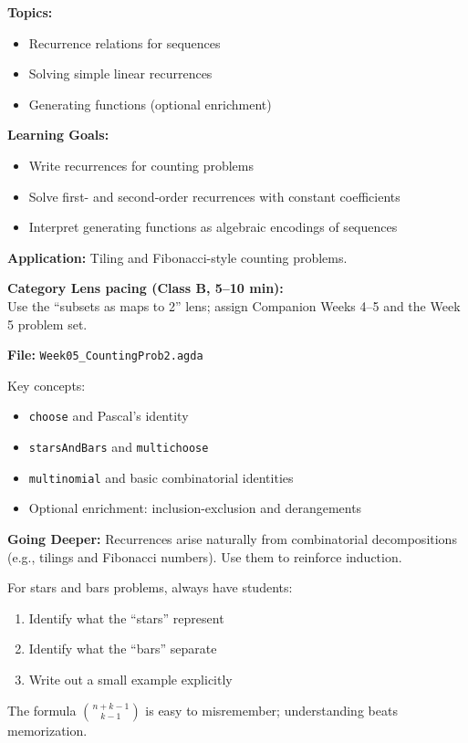 \documentclass[11pt]{article}
\begin{document}
\begin{classbbox}
\textbf{Topics:}
\begin{itemize}
    \item Recurrence relations for sequences
    \item Solving simple linear recurrences
    \item Generating functions (optional enrichment)
\end{itemize}

\textbf{Learning Goals:}
\begin{itemize}
    \item Write recurrences for counting problems
    \item Solve first- and second-order recurrences with constant coefficients
    \item Interpret generating functions as algebraic encodings of sequences
\end{itemize}

\textbf{Application:} Tiling and Fibonacci-style counting problems.
\end{classbbox}

\textbf{Category Lens pacing (Class B, 5--10 min):}\\
Use the ``subsets as maps to 2'' lens; assign Companion Weeks 4--5 and the Week 5 problem set.

\begin{agdabox}
\textbf{File:} \texttt{Week05\_CountingProb2.agda}

Key concepts:
\begin{itemize}
    \item \texttt{choose} and Pascal's identity
    \item \texttt{starsAndBars} and \texttt{multichoose}
    \item \texttt{multinomial} and basic combinatorial identities
    \item Optional enrichment: inclusion-exclusion and derangements
\end{itemize}

\textbf{Going Deeper:} Recurrences arise naturally from combinatorial decompositions (e.g., tilings and Fibonacci numbers). Use them to reinforce induction.
\end{agdabox}

\begin{tipbox}
For stars and bars problems, always have students:
\begin{enumerate}
    \item Identify what the ``stars'' represent
    \item Identify what the ``bars'' separate
    \item Write out a small example explicitly
\end{enumerate}
The formula $\binom{n+k-1}{k-1}$ is easy to misremember; understanding beats memorization.
\end{tipbox}
\end{document}
